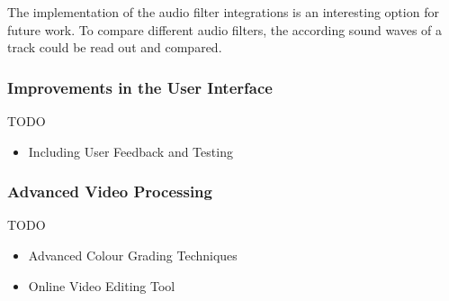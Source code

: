 \documentclass[../MasterThesis.tex]{subfiles}
\begin{document}
The implementation of the audio filter integrations is an interesting option for future work. To compare different audio filters, the according sound waves of a track could be read out and compared.









\subsubsection*{Improvements in the User Interface}


TODO

\begin{itemize}
	\item Including User Feedback and Testing
\end{itemize}








\subsubsection*{Advanced Video Processing}

TODO 

\begin{itemize}
	\item Advanced Colour Grading Techniques
	\item Online Video Editing Tool
\end{itemize}








	
	
	
\end{document}
